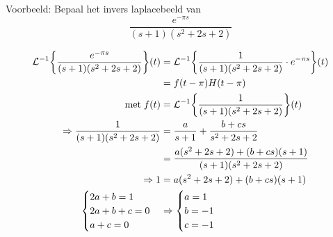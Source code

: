 \documentclass[12pt]{report}
\newcommand{\example}[2]{
    \hrulefill
    
    Voorbeeld: #1
    
    #2
    
    \hrulefill
}
\begin{document}
\example{Bepaal het invers laplacebeeld van 
    $$\frac{e^{-\pi s}}{(s+1)(s^2+2s+2)}$$
}{
    \begin{equation*}
     \begin{split}
      \mathcal{L}^{-1}\bigg\{\frac{e^{-\pi s}}{(s+1)(s^2+2s+2)}\bigg\}(t)
                                                                       & = \mathcal{L}^{-1}\bigg\{\frac{1}{(s+1)(s^2+2s+2)}\cdot e^{-\pi s}\bigg\}(t) \\
                                                                       & = f(t - \pi)H(t - \pi)  \\
                                                                       \hbox{met}\; f(t) & = \mathcal{L}^{-1}\bigg\{\frac{1}{(s+1)(s^2+2s+2)}\bigg\}(t) \\
                                                                       \Rightarrow \frac{1}{(s+1)(s^2+2s+2)} & = \frac{a}{s + 1} + \frac{b + cs}{s^2 + 2s + 2} \\
                                                                                                             & = \frac{a(s^2 + 2s + 2) + (b+cs)(s+1)}{(s+1)(s^2+2s+2)}   \\
                                                                       \Rightarrow 1 & = a(s^2 + 2s + 2) + (b+cs)(s+1) \\
                                                                       \begin{cases}
                                                                        2a + b = 1  \\
                                                                        2a + b + c = 0 \\ 
                                                                        a + c = 0 \\
                                                                       \end{cases} 
                                                                       & \Rightarrow
                                                                       \begin{cases}
                                                                        a = 1  \\
                                                                        b = -1\\ 
                                                                        c = -1 \\
                                                                       \end{cases} \\

\end{split}
\end{equation*}}
\end{document}
